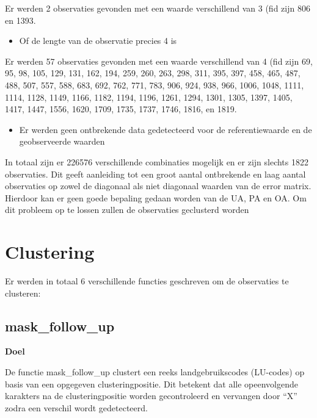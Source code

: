 \documentclass[twoside]{extreport}
\providecommand{\tightlist}{%
  \setlength{\itemsep}{0pt}\setlength{\parskip}{0pt}}\usepackage{longtable,booktabs,array}
\begin{document}
Er werden 2 observaties gevonden met een waarde verschillend van 3 (fid
zijn 806 en 1393.

\begin{itemize}
\tightlist
\item
  Of de lengte van de observatie precies 4 is
\end{itemize}

Er werden 57 observaties gevonden met een waarde verschillend van 4 (fid
zijn 69, 95, 98, 105, 129, 131, 162, 194, 259, 260, 263, 298, 311, 395,
397, 458, 465, 487, 488, 507, 557, 588, 683, 692, 762, 771, 783, 906,
924, 938, 966, 1006, 1048, 1111, 1114, 1128, 1149, 1166, 1182, 1194,
1196, 1261, 1294, 1301, 1305, 1397, 1405, 1417, 1447, 1556, 1620, 1709,
1735, 1737, 1746, 1816, en 1819.

\begin{itemize}
\tightlist
\item
  Er werden geen ontbrekende data gedetecteerd voor de referentiewaarde
  en de geobserveerde waarden
\end{itemize}

In totaal zijn er 226576 verschillende combinaties mogelijk en er zijn
slechts 1822 observaties. Dit geeft aanleiding tot een groot aantal
ontbrekende en laag aantal observaties op zowel de diagonaal als niet
diagonaal waarden van de error matrix. Hierdoor kan er geen goede
bepaling gedaan worden van de UA, PA en OA. Om dit probleem op te lossen
zullen de observaties geclusterd worden


\chapter{Clustering}\label{clustering}

Er werden in totaal 6 verschillende functies geschreven om de
observaties te clusteren:

\section{mask\_follow\_up}\label{mask_follow_up}

\textbf{Doel}

De functie mask\_follow\_up clustert een reeks landgebruikscodes
(LU-codes) op basis van een opgegeven clusteringpositie. Dit betekent
dat alle opeenvolgende karakters na de clusteringpositie worden
gecontroleerd en vervangen door ``X'' zodra een verschil wordt
gedetecteerd.
\end{document}
